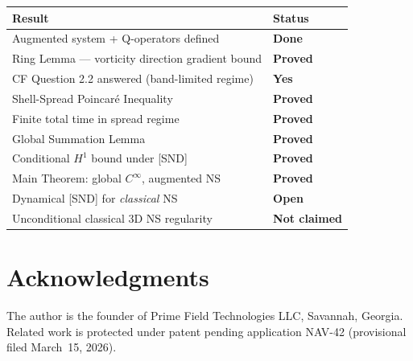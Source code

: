 \documentclass[11pt]{article}
\begin{document}
\begin{center}
\begin{tabular}{>{\raggedright\arraybackslash}p{8cm} >{\centering\arraybackslash}p{3cm}}
\toprule
\textbf{Result} & \textbf{Status} \\
\midrule
\rowcolor{lightgreen}
Augmented system + Q-operators defined & \textcolor{proved}{\textbf{Done}} \\
\rowcolor{lightgreen}
Ring Lemma --- vorticity direction gradient bound & \textcolor{proved}{\textbf{Proved}} \\
\rowcolor{lightgreen}
CF Question 2.2 answered (band-limited regime) & \textcolor{proved}{\textbf{Yes}} \\
\rowcolor{lightgreen}
Shell-Spread Poincar\'e Inequality & \textcolor{proved}{\textbf{Proved}} \\
\rowcolor{lightgreen}
Finite total time in spread regime & \textcolor{proved}{\textbf{Proved}} \\
\rowcolor{lightgreen}
Global Summation Lemma & \textcolor{proved}{\textbf{Proved}} \\
\rowcolor{lightgreen}
Conditional $H^1$ bound under [SND] & \textcolor{proved}{\textbf{Proved}} \\
\rowcolor{lightgreen}
Main Theorem: global $C^\infty$, augmented NS & \textcolor{proved}{\textbf{Proved}} \\
\midrule
\rowcolor{lightred}
Dynamical [SND] for \emph{classical} NS & \textcolor{open}{\textbf{Open}} \\
\rowcolor{lightgray}
Unconditional classical 3D NS regularity & \textcolor{notclaimed}{\textbf{Not claimed}} \\
\bottomrule
\end{tabular}
\end{center}

\section*{Acknowledgments}

The author is the founder of Prime Field Technologies LLC, Savannah, Georgia.
Related work is protected under patent pending application NAV-42
(provisional filed March~15, 2026).
\end{document}
